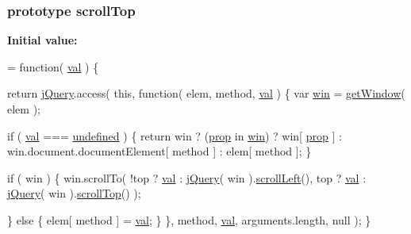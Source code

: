\subsubsection[{scroll\+Top}]{ {\bf prototype} scroll\+Top}\label{jquery-1_810_82-vsdoc_8js_a1b81b50a7190916ff4f07febc824b85d}
{\bfseries Initial value\+:}
\begin{DoxyCode}
= \textcolor{keyword}{function}( \hyperlink{jquery-1_810_82-vsdoc_8js_a0888cacd53defa08fbb4972d54ece4b0}{val} ) \{


        \textcolor{keywordflow}{return} \hyperlink{jquery-1_810_82-vsdoc_8js_add5237586d970a38a81f990e8eb28c6c}{jQuery}.access( \textcolor{keyword}{this}, \textcolor{keyword}{function}( elem, method, \hyperlink{jquery-1_810_82-vsdoc_8js_a0888cacd53defa08fbb4972d54ece4b0}{val} ) \{
            var \hyperlink{_bibabook_2_scripts_2respond_8js_a0d799b5d86c2a73eb9d6d34a1a836797}{win} = \hyperlink{_bibabook_2_scripts_2jquery-1_810_82_8js_ab8e6e1fb3b8b51b6afe437c63df0e09f}{getWindow}( elem );

            \textcolor{keywordflow}{if} ( \hyperlink{jquery-1_810_82-vsdoc_8js_a0888cacd53defa08fbb4972d54ece4b0}{val} === \hyperlink{jquery-1_810_82-vsdoc_8js_a08113a236cc18d2a9d5ce27e638012be}{undefined} ) \{
                \textcolor{keywordflow}{return} win ? (\hyperlink{jquery-1_810_82-vsdoc_8js_af17be84954030af6c2286f5da385d41b}{prop} in \hyperlink{_bibabook_2_scripts_2respond_8js_a0d799b5d86c2a73eb9d6d34a1a836797}{win}) ? win[ \hyperlink{jquery-1_810_82-vsdoc_8js_af17be84954030af6c2286f5da385d41b}{prop} ] :
                    win.document.documentElement[ method ] :
                    elem[ method ];
            \}

            \textcolor{keywordflow}{if} ( win ) \{
                win.scrollTo(
                    !top ? \hyperlink{jquery-1_810_82-vsdoc_8js_a0888cacd53defa08fbb4972d54ece4b0}{val} : \hyperlink{jquery-1_810_82-vsdoc_8js_add5237586d970a38a81f990e8eb28c6c}{jQuery}( win ).\hyperlink{jquery-1_810_82-vsdoc_8js_accc573ddf4124d723e9a6da272bb24f2}{scrollLeft}(),
                    top ? \hyperlink{jquery-1_810_82-vsdoc_8js_a0888cacd53defa08fbb4972d54ece4b0}{val} : \hyperlink{jquery-1_810_82-vsdoc_8js_add5237586d970a38a81f990e8eb28c6c}{jQuery}( win ).\hyperlink{jquery-1_810_82-vsdoc_8js_a1b81b50a7190916ff4f07febc824b85d}{scrollTop}()
                );

            \} \textcolor{keywordflow}{else} \{
                elem[ method ] = \hyperlink{jquery-1_810_82-vsdoc_8js_a0888cacd53defa08fbb4972d54ece4b0}{val};
            \}
        \}, method, \hyperlink{jquery-1_810_82-vsdoc_8js_a0888cacd53defa08fbb4972d54ece4b0}{val}, arguments.length, null );
    \}
\end{DoxyCode}
\hypertarget{jquery-1_810_82-vsdoc_8js_a861f73402c6bb8457b04e4c36686ce8c}{}
